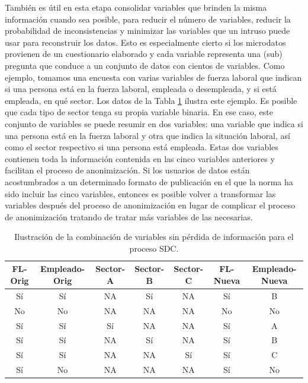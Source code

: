 \documentclass[]{book}
\theoremstyle{definition}
\theoremstyle{definition}
\theoremstyle{definition}
\theoremstyle{definition}
\theoremstyle{remark}
\begin{document}
También es útil en esta etapa consolidar variables que brinden la misma información cuando sea posible, para reducir el número de variables, reducir la probabilidad de inconsistencias y minimizar las variables que un intruso puede usar para reconstruir los datos. Esto es especialmente cierto si los microdatos provienen de un cuestionario elaborado y cada variable representa una (sub) pregunta que conduce a un conjunto de datos con cientos de variables. Como ejemplo, tomamos una encuesta con varias variables de fuerza laboral que indican si una persona está en la fuerza laboral, empleada o desempleada, y si está empleada, en qué sector. Los datos de la Tabla \ref{tab:tabProc1} ilustra este ejemplo. Es posible que cada tipo de sector tenga su propia variable binaria. En ese caso, este conjunto de variables se puede resumir en dos variables: una variable que indica si una persona está en la fuerza laboral y otra que indica la situación laboral, así como el sector respectivo si una persona está empleada. Estas dos variables contienen toda la información contenida en las cinco variables anteriores y facilitan el proceso de anonimización. Si los usuarios de datos están acostumbrados a un determinado formato de publicación en el que la norma ha sido incluir las cinco variables, entonces es posible volver a transformar las variables después del proceso de anonimización en lugar de complicar el proceso de anonimización tratando de tratar más variables de las necesarias.

\begin{table}

\caption{\label{tab:tabProc1}Ilustración de la combinación de variables sin pérdida de información para el proceso SDC.}
\centering
\begin{tabular}[t]{c|c|c|c|c|c|c}
\hline
FL-Orig & Empleado-Orig & Sector-A & Sector-B & Sector-C & FL-Nueva & Empleado-Nueva\\
\hline
Sí & Sí & NA & Sí & NA & Sí & B\\
\hline
No & No & NA & NA & NA & No & No\\
\hline
Sí & Sí & Sí & NA & NA & Sí & A\\
\hline
Sí & Sí & NA & Sí & NA & Sí & B\\
\hline
Sí & Sí & NA & NA & Sí & Sí & C\\
\hline
Sí & No & NA & NA & NA & Sí & No\\
\hline
\end{tabular}
\end{table}
\end{document}
